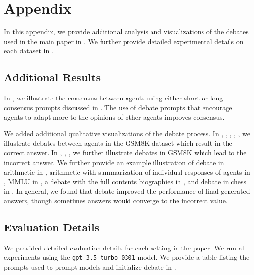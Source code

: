 

\section{Appendix}

In this appendix, we provide additional analysis and visualizations of the debates used in the main paper in . We further provide detailed experimental details on each dataset in .

\subsection{Additional Results}
\label{sect:additional_results}


\vspace{3pt}
 In , we illustrate the consensus between agents using either short or long consensus prompts discussed in . The use of debate prompts that encourage agents to adapt more to the opinions of other agents improves consensus. 



 We added additional qualitative visualizations of the debate process. In , , , , , we illustrate debates between agents in the GSM8K dataset which result in the correct answer. In , , , we further illustrate debates in GSM8K which lead to the incorrect answer. We further provide an example illustration of debate in arithmetic in , arithmetic with summarization of individual responses of agents in , MMLU in , a debate with the full contents biographies in , and debate in chess in . In general, we found that debate improved the performance of final generated answers, though sometimes answers would converge to the incorrect value.

\subsection{Evaluation Details}
\label{sect:evaluation}

We provided detailed evaluation details for each setting in the paper. We run all experiments using the \texttt{gpt-3.5-turbo-0301} model. We provide a table listing the prompts used to prompt models and initialize debate in .

